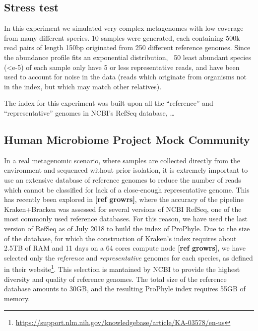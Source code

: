 \subsection{Stress test}

In this experiment we simulated very complex metagenomes with low coverage from many different species. 10 samples were generated, each containing 500k read pairs of length 150bp originated from 250 different reference genomes. Since the abundance profile fits an exponential distribution, ~50 least abundant species (<e-5) of each sample only have 5 or less representative reads, and have been used to account for noise in the data (reads which originate from organisms not in the index, but which may match other relatives).

The index for this experiment was built upon all the ``reference'' and ``representative'' genomes in NCBI's RefSeq database, \dots

\subsection{Human Microbiome Project Mock Community}

In a real metagenomic scenario, where samples are collected directly from the environment and sequenced without prior isolation, it is extremely important to use an extensive database of reference genomes to reduce the number of reads which cannot be classified for lack of a close-enough representative genome. This has recently been explored in \textbf{[ref growrs]}, where the accuracy of the pipeline Kraken+Bracken was assessed for several versions of NCBI RefSeq, one of the most commonly used reference databases. For this reason, we have used the last version of RefSeq as of July 2018 to build the index of ProPhyle. Due to the size of the database, for which the construction of Kraken's index requires about 2.5TB of RAM and 11 days on a 64 cores compute node \textbf{[ref growrs]}, we have selected only the \textit{reference} and \textit{representative} genomes for each species, as defined in their website\footnote{\url{https://support.nlm.nih.gov/knowledgebase/article/KA-03578/en-us}}. This selection is mantained by NCBI to provide the highest diversity and quality of reference genomes. The total size of the reference database amounts to 30GB, and the resulting ProPhyle index requires 55GB of memory.

